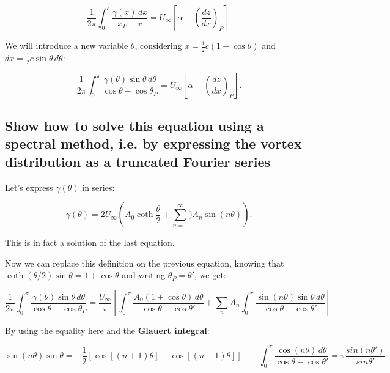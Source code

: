 \documentclass[british,french,11pt, a4paper, openany]{article}
\begin{document}
\begin{equation}
\frac{1}{2\pi} \int _0 ^c \frac{\gamma (x)\, dx}{x_P - x} = U_{\infty}\left[ \alpha -  \left(\frac{dz}{dx} \right)_P \right].
\end{equation}

We will introduce a new variable $\theta$, considering $x = \frac{1}{2}c (1-\cos \theta)$ and $dx = \frac{1}{2}c \sin \theta\, d\theta$: 

\begin{equation}
\frac{1}{2\pi} \int _0 ^{\pi} \frac{\gamma (\theta)\sin \theta \, d\theta}{\cos \theta - \cos \theta _P} = U_{\infty}\left[ \alpha -  \left(\frac{dz}{dx} \right)_P \right].
\label{eq:2.61}
\end{equation}

\subsection{Show how to solve this equation using a spectral method, i.e. by expressing	the vortex distribution as a truncated Fourier series}


Let's express $\gamma (\theta )$ in series: 

\begin{equation}
\gamma (\theta ) = 2U_\infty \left(A_0 \coth \frac{\theta }{2} + \sum _{n=1}^\infty) A_n \sin (n\theta)\right).
\end{equation}

This is in fact a solution of the last equation. 

Now we can replace this definition on the previous equation, knowing that $\coth (\theta /2) \sin \theta = 1+\cos \theta$ and writing $\theta _P = \theta '$, we get:

\begin{equation}
\frac{1}{2\pi} \int _0 ^{\pi} \frac{\gamma (\theta)\sin \theta \, d\theta}{\cos \theta - \cos \theta _P}  = \frac{U_\infty}{\pi} \left[ \int _0 ^{\pi} \frac{A_0 (1+\cos \theta ) \, d\theta}{\cos \theta - \cos \theta '} + \sum _n A_n \int _0 ^{\pi}  \frac{\sin (n\theta)\sin \theta \, d\theta}{\cos \theta - \cos \theta '}  \right]
\end{equation}

By using the equality here and the \textbf{Glauert integral}:

\begin{equation}
\sin (n\theta ) \sin \theta = - \frac{1}{2} [\cos [(n+1)\theta] - \cos [(n-1)\theta]] \qquad \int _0 ^\pi \frac{\cos (n\theta)\, d\theta}{\cos \theta - \cos \theta '} = \pi \frac{sin(n\theta ')}{sin \theta '}
\end{equation}
\end{document}
